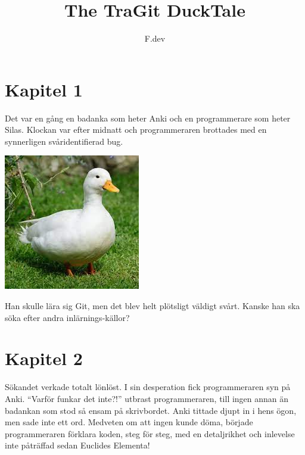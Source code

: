 \documentclass[a4paper]{article}
\begin{document}
\title{The TraGit DuckTale}
\author{F.dev}
\maketitle

\section*{Kapitel 1}
Det var en gång en badanka som heter Anki och en programmerare som heter Silas.
Klockan var efter midnatt och programmeraren brottades med en synnerligen svåridentifierad bug.

\begin{center}
	\includegraphics[scale=0.3]{duck.jpeg}
\end{center}

Han skulle lära sig Git, men det blev helt plötsligt väldigt svårt. Kanske han ska söka efter andra inlärnings-källor?

\section*{Kapitel 2}
Sökandet verkade totalt lönlöst. I sin desperation fick programmeraren syn på Anki.
``Varför funkar det inte?!'' utbrast programmeraren, till ingen annan än badankan som stod så ensam på skrivbordet.
Anki tittade djupt in i hens ögon, men sade inte ett ord. Medveten om att ingen kunde döma, började programmeraren förklara koden, steg för steg, med en detaljrikhet och inlevelse inte påträffad sedan Euclides Elementa!

\end{document}
